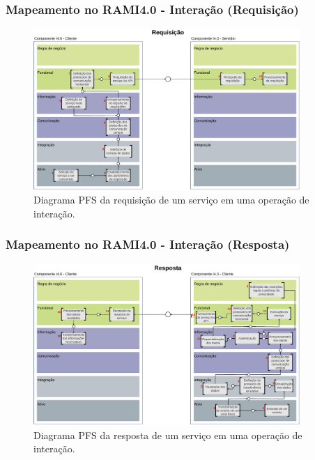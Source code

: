 \documentclass[10pt]{beamer}
\begin{document}
\begin{frame}
	\frametitle{Mapeamento no RAMI4.0 - Interação (Requisição)}
	
	\begin{figure}[htb]
		\centering
		\caption{Diagrama PFS da requisição de um serviço em uma operação de interação.}
		\label{fig:rami-interacao-requisicao}
		\includegraphics[width=0.9\textwidth]{rami-interacao-requisicao}
	
	\end{figure}
	
\end{frame}
\begin{frame}
	\frametitle{Mapeamento no RAMI4.0 - Interação (Resposta)}
	
	\begin{figure}[htb]
		\centering
		\caption{Diagrama PFS da resposta de um serviço em uma operação de interação.}
		\label{fig:rami-interacao-resposta}
		\includegraphics[width=0.9\textwidth]{rami-interacao-resposta}

	\end{figure}
	
\end{frame}
\end{document}
